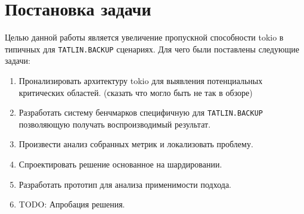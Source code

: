 
\section{Постановка задачи}
\label{sec:task}

Целью данной работы является увеличение пропускной способности tokio в типичных для \verb|TATLIN.BACKUP| сценариях. Для чего были поставлены следующие задачи:

\begin{enumerate}
    \item Пронализировать архитектуру tokio для выявления потенциальных критических областей. (сказать что могло быть не так в обзоре)
    \item Разработать систему бенчмарков специфичную для \verb|TATLIN.BACKUP| позволяющую получать воспроизводимый результат.
    \item Произвести анализ собранных метрик и локализовать проблему.
    \item Спроектировать решение основанное на шардировании.
    \item Разработать прототип для анализа применимости подхода.
    \item TODO: Апробация решения.
\end{enumerate}
